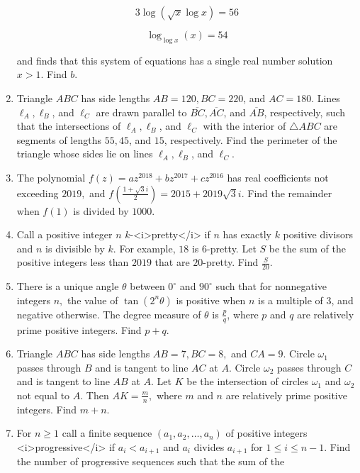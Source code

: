 \documentclass{article}
\begin{document}
\begin{enumerate}[label=\arabic*., itemsep=0.5em]
\begin{equation*}
3\log(\sqrt{x}\log x)=56
\end{equation*}


\begin{equation*}
\log_{\log x}(x)=54
\end{equation*}

and finds that this system of equations has a single real number solution $x>1$. Find $b$.\par \vspace{0.5em}\item Triangle $ABC$ has side lengths $AB=120,BC=220$, and $AC=180$. Lines $\ell_A,\ell_B$, and $\ell_C$ are drawn parallel to $\overline{BC},\overline{AC}$, and $\overline{AB}$, respectively, such that the intersections of $\ell_A,\ell_B$, and $\ell_C$ with the interior of $\triangle ABC$ are segments of lengths $55,45$, and $15$, respectively. Find the perimeter of the triangle whose sides lie on lines $\ell_A,\ell_B$, and $\ell_C$.\par \vspace{0.5em}\item The polynomial $f(z)=az^{2018}+bz^{2017}+cz^{2016}$ has real coefficients not exceeding $2019,$ and $f\left(\tfrac{1+\sqrt3i}{2}\right)=2015+2019\sqrt3i$. Find the remainder when $f(1)$ is divided by $1000$.\par \vspace{0.5em}\item Call a positive integer $n$ $k$-<i>pretty</i> if $n$ has exactly $k$ positive divisors and $n$ is divisible by $k$. For example, $18$ is $6$-pretty. Let $S$ be the sum of the positive integers less than $2019$ that are $20$-pretty. Find $\tfrac{S}{20}$.\par \vspace{0.5em}\item There is a unique angle $\theta$ between $0^\circ$ and $90^\circ$ such that for nonnegative integers $n,$ the value of $\tan(2^n\theta)$ is positive when $n$ is a multiple of $3$, and negative otherwise. The degree measure of $\theta$ is $\tfrac{p}{q}$, where $p$ and $q$ are relatively prime positive integers. Find $p+q$.\par \vspace{0.5em}\item Triangle $ABC$ has side lengths $AB=7,BC=8,$ and $CA=9.$ Circle $\omega_1$ passes through $B$ and is tangent to line $AC$ at $A.$ Circle $\omega_2$ passes through $C$ and is tangent to line $AB$ at $A.$ Let $K$ be the intersection of circles $\omega_1$ and $\omega_2$ not equal to $A.$ Then $AK=\tfrac{m}{n},$ where $m$ and $n$ are relatively prime positive integers. Find $m+n.$\par \vspace{0.5em}\item For $n\ge1$ call a finite sequence $(a_1,a_2,\ldots,a_n)$ of positive integers <i>progressive</i> if $a_i<a_{i+1}$ and $a_i$ divides $a_{i+1}$ for $1\le i\le n-1$. Find the number of progressive sequences such that the sum of the 
\end{enumerate}
\end{document}
